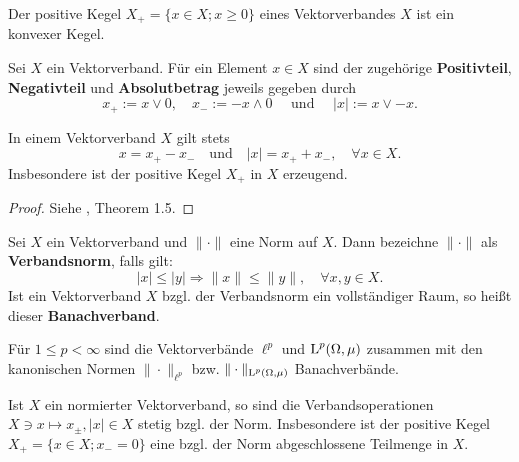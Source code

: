 \begin{bsp}%
Der positive Kegel $X_+=\{x\in X; x\geq 0\}$ eines Vektorverbandes $X$ ist ein konvexer Kegel. 
\end{bsp}

\begin{defi}
Sei $X$ ein Vektorverband. Für ein Element $x\in X$ sind der zugehörige  \textbf{Positivteil}, \textbf{Negativteil} und \textbf{Absolutbetrag} jeweils gegeben durch
\begin{equation*}
x_+:=x\vee 0,\quad x_-:=-x \wedge 0\quad\text{ und }\quad |x|:=x \vee -x.
\end{equation*}
\end{defi}



\begin{prop}
In einem Vektorverband $X$ gilt stets
\begin{equation*}
x = x_+ - x_-\quad \text{und}\quad |x| = x_+ + x_-,\quad \forall x\in X.
\end{equation*}
Insbesondere ist der positive Kegel $X_+$ in $X$ erzeugend.
\end{prop}

\begin{proof}
Siehe \cite{aliprantis_burkinshaw_2006}, Theorem 1.5.
\end{proof}


\begin{defi}
Sei $X$ ein Vektorverband und $\|\cdot\|$ eine Norm auf $X$. Dann bezeichne  $\|\cdot\|$ als \textbf{Verbandsnorm}, falls gilt:
\begin{equation*}\label{identity}
|x |\leq  |y |\Rightarrow  \|x \|\leq  \|y \|,\quad\forall x,y\in X.
\end{equation*}
Ist ein Vektorverband $X$ bzgl. der Verbandsnorm ein vollständiger Raum, so heißt dieser \textbf{Banachverband}.
\end{defi}

\begin{bsp}
Für $1\leq p<\infty$ sind die Vektorverbände $\ell^p$ und $\textnormal{L}^p(\Omega,\mu)$ zusammen mit den kanonischen Normen $\|\cdot \|_{\ell^p}$ bzw. $\|\cdot\|_{\textnormal{L}^p(\Omega,\mu)}$ Banachverbände.
\end{bsp}

\begin{bem}\label{Abgeschlossenheit des Kegels}
Ist $X$ ein normierter Vektorverband, so sind die Verbandsoperationen $X\ni x\mapsto x_\pm, |x|\in X$ stetig bzgl. der Norm. Insbesondere ist der positive Kegel $X_+=\{x\in X; x_-=0\}$ eine bzgl. der Norm  abgeschlossene Teilmenge in $X$.
\end{bem}


